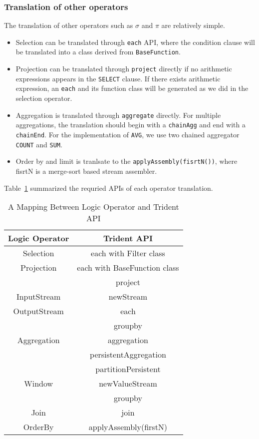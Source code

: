\documentclass[conference, twocolumn, 11pt]{IEEEtran}
\theoremstyle{definition}
\begin{document}
\subsubsection{Translation of other operators}
The translation of other operators such as $\sigma$ and $\pi$ are relatively simple.
\begin{itemize}
\item Selection can be translated through \texttt{each} API, where the condition clause will be translated into a class derived from \texttt{BaseFunction}.
\item Projection can be translated through \texttt{project} directly if no arithmetic expressions appears in the \texttt{SELECT} clause. If there exists arithmetic expression, an \texttt{each} and its function class will be generated as we did in the selection operator.
\item Aggregation is translated through \texttt{aggregate} directly. For multiple aggregations, the translation should begin with a \texttt{chainAgg} and end with a \texttt{chainEnd}. For the implementation of \texttt{AVG}, we use two chained aggregator \texttt{COUNT} and \texttt{SUM}.
\item Order by and limit is tranlsate to the \texttt{applyAssembly(fisrtN())}, where fisrtN is a merge-sort based stream assembler.
\end{itemize}
Table~\ref{api-mapping} summarized the requried APIs of each operator translation.
\begin{table}[hbt]
\caption{A Mapping Between Logic Operator and Trident API}
\label{api-mapping}
\centering
\begin{tabular}{|c|c|}
\hline
Logic Operator & Trident API \\
\hline
Selection      & each with Filter class \\
\hline
Projection     & each with BaseFunction class \\
               & project \\
\hline
InputStream    & newStream \\
\hline
OutputStream   & each \\
\hline
               & groupby       \\
Aggregation    & aggregation \\
               & persistentAggregation \\
\hline
               & partitionPersistent \\ 
Window         & newValueStream      \\ 
               & groupby             \\
\hline
Join           & join                 \\
\hline
OrderBy        & applyAssembly(firstN) \\
\hline
\end{tabular}
\end{table}
\end{document}
